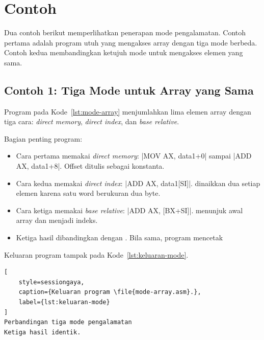 \section{Contoh}
\label{sec:contoh-bab12}

Dua contoh berikut memperlihatkan penerapan mode pengalamatan.
Contoh pertama adalah program utuh yang mengakses array dengan tiga
mode berbeda. Contoh kedua membandingkan ketujuh mode untuk mengakses
elemen yang sama.

\subsection{Contoh 1: Tiga Mode untuk Array yang Sama}

Program pada Kode~\ref{lst:mode-array} menjumlahkan lima elemen array
dengan tiga cara: \textit{direct memory}, \textit{direct index}, dan
\textit{base relative}.



Bagian penting program:

\begin{itemize}
    \item Cara pertama memakai \textit{direct memory}:
          \lstasm|MOV AX, data1+0| sampai \lstasm|ADD AX, data1+8|.
          Offset ditulis sebagai konstanta.
    \item Cara kedua memakai \textit{direct index}:
          \lstasm|ADD AX, data1[SI]|.  dinaikkan dua setiap
          elemen karena satu word berukuran dua byte.
    \item Cara ketiga memakai \textit{base relative}:
          \lstasm|ADD AX, [BX+SI]|.  menunjuk awal array dan
           menjadi indeks.
    \item Ketiga hasil dibandingkan dengan . Bila sama,
          program mencetak 
\end{itemize}

Keluaran program tampak pada Kode~\ref{lst:keluaran-mode}.

\begin{lstlisting}[
    style=sessiongaya,
    caption={Keluaran program \file{mode-array.asm}.},
    label={lst:keluaran-mode}
]
Perbandingan tiga mode pengalamatan
Ketiga hasil identik.
\end{lstlisting}

